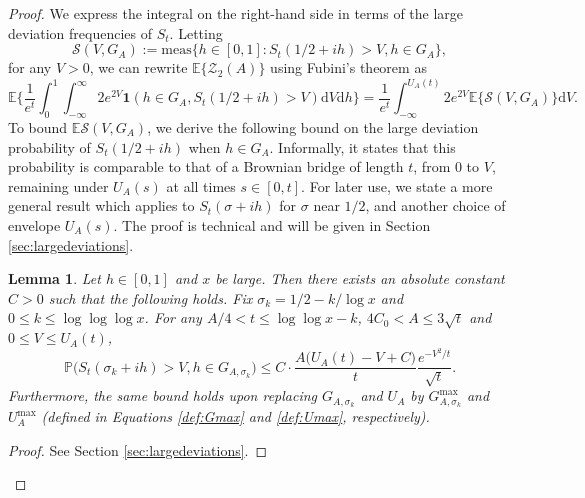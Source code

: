 \documentclass{amsart}
\newtheorem{lemma}[theorem]{Lemma}
\theoremstyle{definition}
\theoremstyle{remark}
\numberwithin{equation}{section}
\begin{document}
\begin{proof}
    We express the integral on the right-hand side in terms of the {large deviation frequencies} of $S_t$. Letting
\begin{equation}\label{eq:defmeas}
    \mathcal{S}(V,G_A):=\text{meas}\{h\in [0,1]:S_{t}(1/2+ih)>V, h\in G_A\},
\end{equation}
for any $V>0$, we can rewrite $\mathbb{E}\{\mathcal{Z}_2(A)\}$ using Fubini's theorem as
\begin{equation}\label{eq:LDpartition}
    \mathbb{E}\bigg\{\frac{1}{e^t}\int_0^1 \int_{-\infty}^\infty 2 e^{2 V}\mathbf{1}(h\in G_A, S_{t}(1/2+ih)>V)\mathrm{d}V\mathrm{d}h\bigg\}=\frac{1}{e^t}\int_{-\infty}^{U_A(t)}2 e^{2 V}\mathbb{E}\big\{\mathcal{S}(V,G_A)\big\}\mathrm{d}V.
\end{equation}
To bound $\mathbb{E}\mathcal{S}(V,G_A)$, we derive the following bound on the large deviation probability of $S_{t}(1/2+ih)$ when $h\in G_A$. Informally, it states that this probability is comparable to that of a Brownian bridge of length $t$, from 0 to $V$, remaining under $U_A(s)$ at all times $s\in [0,t]$. For later use, we state a more general result which applies to $S_t(\sigma+ih)$ for $\sigma$ near $1/2$, and another choice of envelope $U_A(s)$. The proof is technical and will be given in Section \ref{sec:largedeviations}.

\begin{lemma}\label{lem:largedeviations} Let $h\in[0,1]$ and $x$ be large. Then there exists an absolute constant $C>0$ such that the following holds. Fix $\sigma_k=1/2-k/\log x$ and $0\leq k\leq \log\log\log x$. For any $A/4<t\leq \log\log x-k$, $4C_0<A\leq 3\sqrt{t}$ and $0\leq V\leq U_A(t)$, 
\[
    \mathbb{P}\big(S_{t}(\sigma_k+ih)>V, h\in {G_{A,\sigma_k}}\big)\leq C\cdot \frac{A\big(U_A(t)-V+C\big)}{t}\frac{e^{-V^2/t}}{\sqrt{t}}.
\]
Furthermore, the same bound holds upon replacing $G_{A,\sigma_k}$ and $U_A$ by $G_{A,\sigma_k}^{\mathrm{max}}$ and $U_A^{\mathrm{max}}$ (defined in Equations \eqref{def:Gmax} and \eqref{def:Umax}, respectively).
\end{lemma}
\begin{proof}
    See Section \ref{sec:largedeviations}.
\end{proof}


\end{proof}
\end{document}

